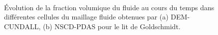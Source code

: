 \begin{figure}[h!]
\hspace{\fill}
   \\
\caption{\label{ep_g_data-time}Évolution de la fraction volumique du fluide au cours du temps dans différentes cellules du maillage fluide obtenues par (a) DEM-CUNDALL, (b) NSCD-PDAS pour le lit de Goldschmidt.}
\end{figure}

